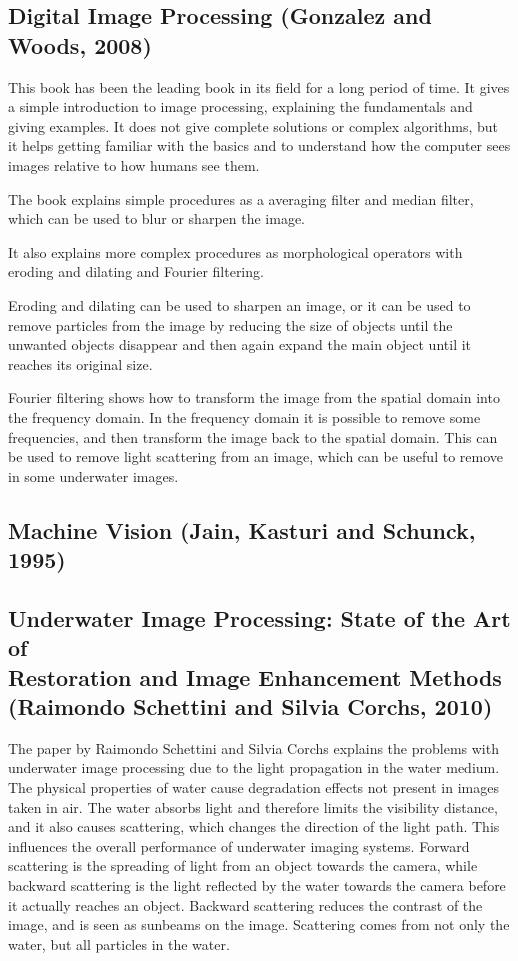 





\subsection{Digital Image Processing (Gonzalez and Woods, 2008)}
This book has been the leading book in its field for a long period of time. It gives a simple introduction to image processing, explaining the fundamentals and giving examples. It does not give complete solutions or complex algorithms, but it helps getting familiar with the basics and to understand how the computer sees images relative to how humans see them.

The book explains simple procedures as a averaging filter and median filter, which can be used to blur or sharpen the image. 

It also explains more complex procedures as morphological operators with eroding and dilating and Fourier filtering. 

Eroding and dilating can be used to sharpen an image, or it can be used to remove particles from the image by reducing the size of objects until the unwanted objects disappear and then again expand the main object until it reaches its original size. 

Fourier filtering shows how to transform the image from the spatial domain into the frequency domain. In the frequency domain it is possible to remove some frequencies, and then transform the image back to the spatial domain. This can be used to remove light scattering from an image, which can be useful to remove in some underwater images.

\subsection{Machine Vision (Jain, Kasturi and Schunck, 1995)}

\subsection{Underwater Image Processing: State of the Art of \\
Restoration and Image Enhancement Methods \\
(Raimondo Schettini and Silvia Corchs, 2010)}
The paper by Raimondo Schettini and Silvia Corchs explains the problems with underwater image processing due to the light propagation in the water medium. The physical properties of water cause degradation effects not present in images taken in air. The water absorbs light and therefore limits the visibility distance, and it also causes scattering, which changes the direction of the light path. This influences the overall performance of underwater imaging systems. Forward scattering is the spreading of light from an object towards the camera, while backward scattering is the light reflected by the water towards the camera before it actually reaches an object. Backward scattering reduces the contrast of the image, and is seen as sunbeams on the image. Scattering comes from not only the water, but all particles in the water. 

